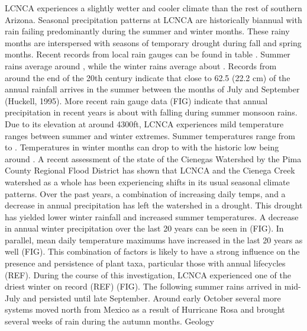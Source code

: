 \documentclass{article}
\begin{document}
LCNCA experiences a slightly wetter and cooler climate than the rest of southern Arizona. Seasonal precipitation patterns at LCNCA are historically biannual with rain failing predominantly during the summer and winter months. These rainy months are interspersed with seasons of temporary drought during fall and spring months. Recent records from local rain gauges can be found in table . Summer rains average around , while the winter rains average about . Records from around the end of the 20th century indicate that close to 62.5 (22.2 cm) of the annual rainfall arrives in the summer between the months of July and September (Huckell, 1995). More recent rain gauge data (FIG) indicate that annual precipitation in recent years is about  with  falling during summer monsoon rains. Due to its elevation at around 4300ft, LCNCA experiences mild temperature ranges between summer and winter extremes. Summer temperatures range from  to . Temperatures in winter months can drop to  with the historic low being around . A recent assessment of the state of the Cienegas Watershed by the Pima County Regional Flood District has shown that LCNCA and the Cienega Creek watershed as a whole has been experiencing shifts in its usual seasonal climate patterns. Over the past  years, a combination of increasing daily temps, and a decrease in annual precipitation has left the watershed in a drought. This drought has yielded lower winter rainfall and increased summer temperatures. A decrease in annual winter precipitation over the last 20 years can be seen in (FIG). In parallel, mean daily temperature maximums have increased in the last 20 years as well (FIG). This combination of factors is likely to have a strong influence on the presence and persistence of plant taxa, particular those with annual lifecycles (REF).  During the course of this investigation, LCNCA experienced one of the driest winter on record (REF) (FIG). The following summer rains arrived in mid-July and persisted until late September. Around early October several more systems moved north from Mexico as a result of Hurricane Rosa and brought several weeks of rain during the autumn months. 
Geology 
\end{document}
